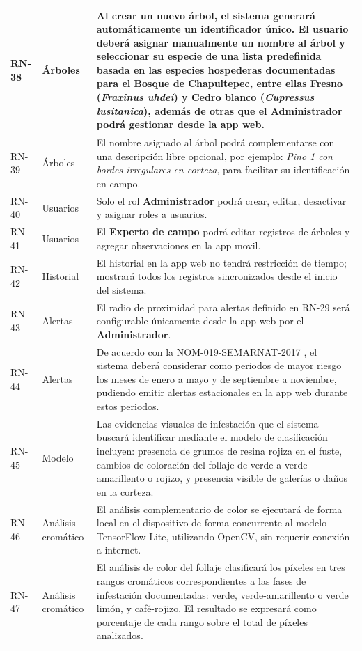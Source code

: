 \begin{longtable}{|>{\centering\arraybackslash}m{1.8cm}|>{\centering\arraybackslash}m{2.5cm}|m{9.5cm}|}
\hline
RN-38 & Árboles & Al crear un nuevo árbol, el sistema generará automáticamente un identificador único. El usuario deberá asignar manualmente un nombre al árbol y seleccionar su especie de una lista predefinida basada en las especies hospederas documentadas para el Bosque de Chapultepec, entre ellas \textbf{Fresno} (\textit{Fraxinus uhdei}) y \textbf{Cedro blanco} (\textit{Cupressus lusitanica}), además de otras que el Administrador podrá gestionar desde la app web. \\
\hline
RN-39 & Árboles & El nombre asignado al árbol podrá complementarse con una descripción libre opcional, por ejemplo: \textit{Pino 1 con bordes irregulares en corteza}, para facilitar su identificación en campo. \\
\hline
RN-40 & Usuarios & Solo el rol \textbf{Administrador} podrá crear, editar, desactivar y asignar roles a usuarios. \\
\hline
RN-41 & Usuarios & El \textbf{Experto de campo} podrá editar registros de árboles y agregar observaciones en la app movil. \\
\hline
RN-42 & Historial & El historial en la app web no tendrá restricción de tiempo; mostrará todos los registros sincronizados desde el inicio del sistema. \\
\hline
RN-43 & Alertas & El radio de proximidad para alertas definido en RN-29 será configurable únicamente desde la app web por el \textbf{Administrador}. \\
\hline
RN-44 & Alertas & De acuerdo con la NOM-019-SEMARNAT-2017 \cite{nom019_semarnat_2017}, el sistema deberá considerar como periodos de mayor riesgo los meses de enero a mayo y de septiembre a noviembre, pudiendo emitir alertas estacionales en la app web durante estos periodos. \\
\hline
RN-45 & Modelo & Las evidencias visuales de infestación que el sistema buscará identificar mediante el modelo de clasificación incluyen: presencia de grumos de resina rojiza en el fuste, cambios de coloración del follaje de verde a verde amarillento o rojizo, y presencia visible de galerías o daños en la corteza. \\
\hline
RN-46 & Análisis cromático & El análisis complementario de color se ejecutará de forma local en el dispositivo de forma concurrente al modelo TensorFlow Lite, utilizando OpenCV, sin requerir conexión a internet. \\
\hline
RN-47 & Análisis cromático & El análisis de color del follaje clasificará los píxeles en tres rangos cromáticos correspondientes a las fases de infestación documentadas: verde, verde-amarillento o verde limón, y café-rojizo. El resultado se expresará como porcentaje de cada rango sobre el total de píxeles analizados. \\

\end{longtable}
